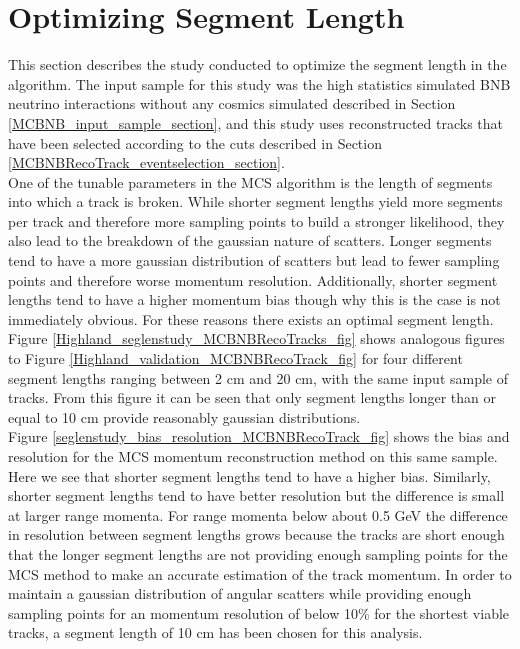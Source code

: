 
\section{Optimizing Segment Length}\label{SegmentLength_MCBNBRecoTrack_section}
This section describes the study conducted to optimize the segment length in the algorithm. The input sample for this study was the high statistics simulated BNB neutrino interactions without any cosmics simulated described in Section \ref{MCBNB_input_sample_section}, and this study uses reconstructed tracks that have been selected according to the cuts described in Section \ref{MCBNBRecoTrack_eventselection_section}.\\


One of the tunable parameters in the MCS algorithm is the length of segments into which a track is broken. While shorter segment lengths yield more segments per track and therefore more sampling points to build a stronger likelihood, they also lead to the breakdown of the gaussian nature of scatters. Longer segments tend to have a more gaussian distribution of scatters but lead to fewer sampling points and therefore worse momentum resolution. Additionally, shorter segment lengths tend to have a higher momentum bias though why this is the case is not immediately obvious. For these reasons there exists an optimal segment length. Figure \ref{Highland_seglenstudy_MCBNBRecoTracks_fig} shows analogous figures to Figure \ref{Highland_validation_MCBNBRecoTrack_fig} for four different segment lengths ranging between 2 cm and 20 cm, with the same input sample of tracks. From this figure it can be seen that only segment lengths longer than or equal to 10 cm provide reasonably gaussian distributions.\\
Figure \ref{seglenstudy_bias_resolution_MCBNBRecoTrack_fig} shows the bias and resolution for the MCS momentum reconstruction method on this same sample. Here we see that shorter segment lengths tend to have a higher bias. Similarly, shorter segment lengths tend to have better resolution but the difference is small at larger range momenta. For range momenta below about 0.5 GeV the difference in resolution between segment lengths grows because the tracks are short enough that the longer segment lengths are not providing enough sampling points for the MCS method to make an accurate estimation of the track momentum. In order to maintain a gaussian distribution of angular scatters while providing enough sampling points for an momentum resolution of below 10\% for the shortest viable tracks, a segment length of 10 cm has been chosen for this analysis.

